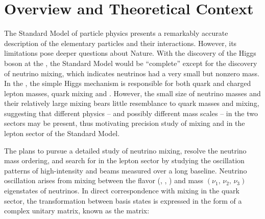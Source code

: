\section{Overview and Theoretical Context}

\label{sec:physics-lbnosc-context}

The Standard Model of particle physics presents a remarkably accurate
description of the elementary particles and their
interactions. However, its limitations pose deeper questions about
Nature. With the discovery of the Higgs boson at the , the Standard
Model would be ``complete'' except for the discovery of neutrino
mixing, which indicates neutrinos had a very small but nonzero
mass. In the , %
the simple Higgs mechanism is responsible
for both quark and charged lepton masses, quark mixing and
. %
However, the small size of neutrino
masses and their relatively large mixing bears little resemblance to
quark masses and mixing, suggesting that different physics -- and
possibly different mass scales -- in the two sectors may be present,
thus motivating precision study of mixing and  %
in the
lepton sector of the Standard Model. 


The  plans to pursue a detailed study of neutrino mixing, resolve the
neutrino mass ordering, and search for  %
in the lepton
sector by studying the oscillation patterns of
high-intensity \numu and \anumu %
beams measured over a long baseline.  Neutrino oscillation arises from
mixing between the flavor 
(\nue, \numu, \nutau) and mass $(\nu_1,\, \nu_2,\, \nu_3)$ eigenstates
of neutrinos.
In direct correspondence with mixing in the quark sector, the transformation
between basis states is expressed in the form of a complex unitary
matrix, known as the  matrix: %

